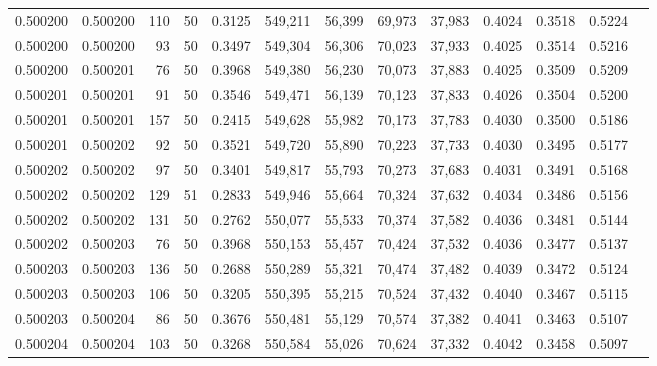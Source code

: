 \begin{tabular}{rrrrrrrrrrrrr}
0.500200 & 0.500200 &   110 &  50 &                                     0.3125 & 549,211 &  56,399 &  69,973 &  37,983 & 0.4024 & 0.3518 & 0.5224 \\
0.500200 & 0.500200 &    93 &  50 &                                     0.3497 & 549,304 &  56,306 &  70,023 &  37,933 & 0.4025 & 0.3514 & 0.5216 \\
0.500200 & 0.500201 &    76 &  50 &                                     0.3968 & 549,380 &  56,230 &  70,073 &  37,883 & 0.4025 & 0.3509 & 0.5209 \\
0.500201 & 0.500201 &    91 &  50 &                                     0.3546 & 549,471 &  56,139 &  70,123 &  37,833 & 0.4026 & 0.3504 & 0.5200 \\
0.500201 & 0.500201 &   157 &  50 &                                     0.2415 & 549,628 &  55,982 &  70,173 &  37,783 & 0.4030 & 0.3500 & 0.5186 \\
0.500201 & 0.500202 &    92 &  50 &                                     0.3521 & 549,720 &  55,890 &  70,223 &  37,733 & 0.4030 & 0.3495 & 0.5177 \\
0.500202 & 0.500202 &    97 &  50 &                                     0.3401 & 549,817 &  55,793 &  70,273 &  37,683 & 0.4031 & 0.3491 & 0.5168 \\
0.500202 & 0.500202 &   129 &  51 &                                     0.2833 & 549,946 &  55,664 &  70,324 &  37,632 & 0.4034 & 0.3486 & 0.5156 \\
0.500202 & 0.500202 &   131 &  50 &                                     0.2762 & 550,077 &  55,533 &  70,374 &  37,582 & 0.4036 & 0.3481 & 0.5144 \\
0.500202 & 0.500203 &    76 &  50 &                                     0.3968 & 550,153 &  55,457 &  70,424 &  37,532 & 0.4036 & 0.3477 & 0.5137 \\
0.500203 & 0.500203 &   136 &  50 &                                     0.2688 & 550,289 &  55,321 &  70,474 &  37,482 & 0.4039 & 0.3472 & 0.5124 \\
0.500203 & 0.500203 &   106 &  50 &                                     0.3205 & 550,395 &  55,215 &  70,524 &  37,432 & 0.4040 & 0.3467 & 0.5115 \\
0.500203 & 0.500204 &    86 &  50 &                                     0.3676 & 550,481 &  55,129 &  70,574 &  37,382 & 0.4041 & 0.3463 & 0.5107 \\
0.500204 & 0.500204 &   103 &  50 &                                     0.3268 & 550,584 &  55,026 &  70,624 &  37,332 & 0.4042 & 0.3458 & 0.5097 \\

\end{tabular}

